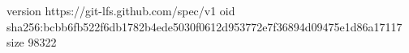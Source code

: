version https://git-lfs.github.com/spec/v1
oid sha256:bcbb6fb522f6db1782b4ede5030f0612d953772e7f36894d09475e1d86a17117
size 98322
